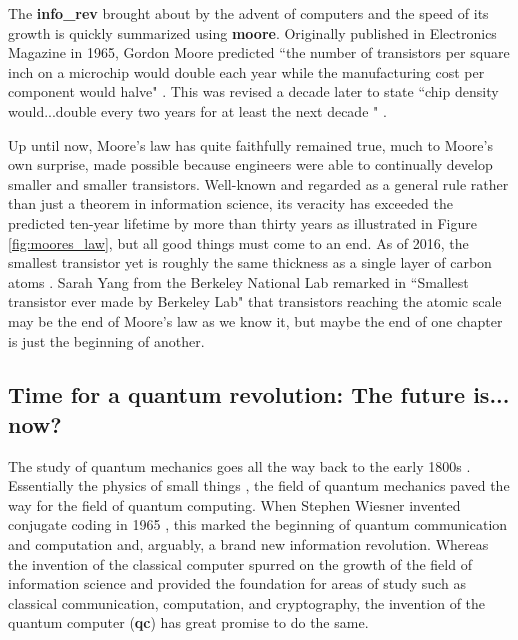 The \textbf{\gls{info_rev}} brought about by the advent of computers and the speed of its growth is quickly summarized using \textbf{\gls{moore}}. Originally published in Electronics Magazine in 1965, Gordon Moore predicted ``the number of transistors per square inch on a microchip would double each year while the manufacturing cost per component would halve" \cite{arcuri_moores}. This was revised a decade later to state ``chip density would...double every two years for at least the next decade
" \cite{arcuri_moores}.

Up until now, Moore's law has quite faithfully remained true, much to Moore's own surprise, made possible because engineers were able to continually develop smaller and smaller transistors. Well-known and regarded as a general rule rather than just a theorem in information science, its veracity has exceeded the predicted ten-year lifetime by more than thirty years as illustrated in Figure \ref{fig:moores_law}, but all good things must come to an end. As of 2016, the smallest transistor yet is roughly the same thickness as a single layer of carbon atoms \cite{yang_transistor}. Sarah Yang from the Berkeley National Lab remarked in ``Smallest transistor ever made by Berkeley Lab" that transistors reaching the atomic scale may be the end of Moore's law as we know it, but maybe the end of one chapter is just the beginning of another. 

\subsection{Time for a quantum revolution: The future is... now?} \label{q_rev}
The study of quantum mechanics goes all the way back to the early 1800s \cite{q_mech_timeline}. Essentially the physics of small things \cite{qc_explained}, the field of quantum mechanics paved the way for the field of quantum computing. When Stephen Wiesner invented conjugate coding in 1965 \cite{qc_timeline}, this marked the beginning of quantum communication and computation and, arguably, a brand new information revolution. Whereas the invention of the classical computer spurred on the growth of the field of information science and provided the foundation for areas of study such as classical communication, computation, and cryptography, the invention of the quantum computer (\textbf{\gls{qc}}) has great promise to do the same.

